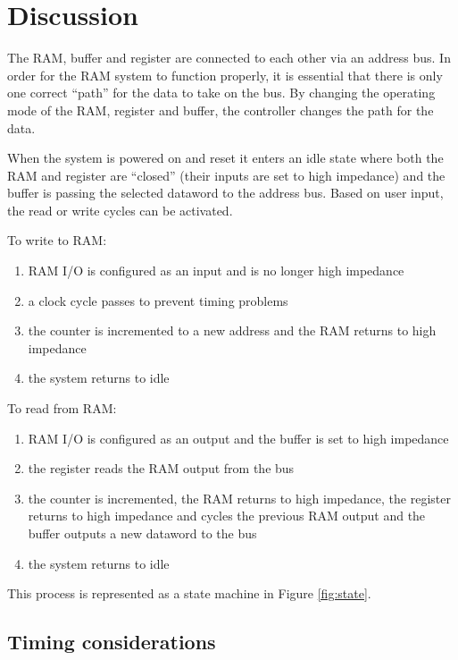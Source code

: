 \documentclass[11pt]{article}
\begin{document}
\section{Discussion}\label{sec:discussion}

The RAM, buffer and register are connected to each other via an address bus. In order for the RAM system to function properly, it is essential that there is only one correct ``path'' for the data to take on the bus. By changing the operating mode of the RAM, register and buffer, the controller changes the path for the data.

When the system is powered on and reset it enters an idle state where both the RAM and register are ``closed'' (their inputs are set to high impedance) and the buffer is passing the selected dataword to the address bus. Based on user input, the read or write cycles can be activated.

To write to RAM:
\begin{enumerate}
 
 	 \item RAM I/O is configured as an input and is no longer high impedance
	 \item a clock cycle passes to prevent timing problems
 	 \item the counter is incremented to a new address and the RAM returns to high impedance
	 \item the system returns to idle
	  
\end{enumerate}

\newpage
To read from RAM:

\begin{enumerate}
 
 	 \item RAM I/O is configured as an output and the buffer is set to high impedance
 	 \item the register reads the RAM output from the bus
 	 \item the counter is incremented, the RAM returns to high impedance, the register returns to high impedance and cycles the previous RAM output and the buffer outputs a new dataword to the bus
 	 \item the system returns to idle
	  
\end{enumerate}

This process is represented as a state machine in Figure \ref{fig:state}.

\subsection{Timing considerations}
\end{document}
